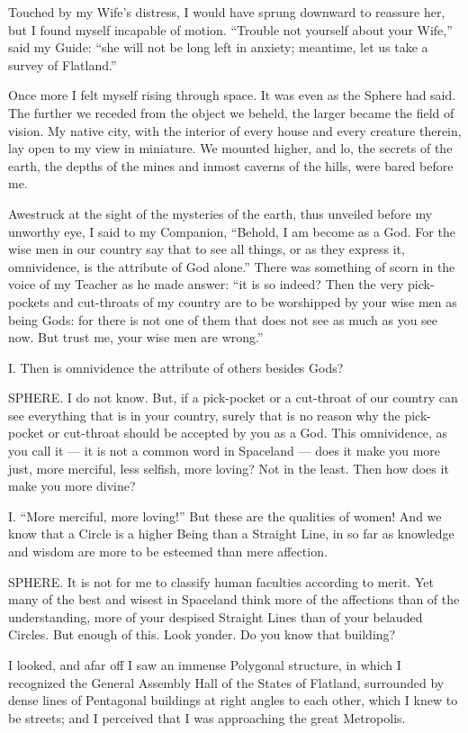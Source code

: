 \documentclass[12pt, a4paper, twoside]{memoir}
\begin{document}
Touched by my Wife's distress, I would have sprung downward to reassure her,
but I found myself incapable of motion. ``Trouble not yourself about your
Wife,'' said my Guide: ``she will not be long left in anxiety; meantime, let us
take a survey of Flatland.''

Once more I felt myself rising through space. It was even as the Sphere had
said. The further we receded from the object we beheld, the larger became the
field of vision. My native city, with the interior of every house and every
creature therein, lay open to my view in miniature. We mounted higher, and lo,
the secrets of the earth, the depths of the mines and inmost caverns of the
hills, were bared before me.

Awestruck at the sight of the mysteries of the earth, thus unveiled before my
unworthy eye, I said to my Companion, ``Behold, I am become as a God. For the
wise men in our country say that to see all things, or as they express it,
omnividence, is the attribute of God alone.'' There was something of scorn in
the voice of my Teacher as he made answer: ``it is so indeed? Then the very
pick-pockets and cut-throats of my country are to be worshipped by your wise
men as being Gods: for there is not one of them that does not see as much as
you see now. But trust me, your wise men are wrong.''

I. Then is omnividence the attribute of
others besides Gods?

SPHERE. I do not know. But, if a pick-pocket or a cut-throat of our country
can see everything that is in your country, surely that is no reason why the
pick-pocket or cut-throat should be accepted by you as a God. This
omnividence, as you call it --- it is not a common word in Spaceland --- does it
make you more just, more merciful, less selfish, more loving? Not in the
least. Then how does it make you more divine?

I. ``More merciful, more loving!'' But these are the qualities of women! And we
know that a Circle is a higher Being than a Straight Line, in so far as
knowledge and wisdom are more to be esteemed than mere affection.

SPHERE. It is not for me to classify human faculties according to merit. Yet
many of the best and wisest in Spaceland think more of the affections than of
the understanding, more of your despised Straight Lines than of your belauded
Circles. But enough of this. Look yonder. Do you know that building?

I looked, and afar off I saw an immense Polygonal structure, in which I
recognized the General Assembly Hall of the States of Flatland, surrounded by
dense lines of Pentagonal buildings at right angles to each other, which I
knew to be streets; and I perceived that I was approaching the great
Metropolis.
\end{document}
